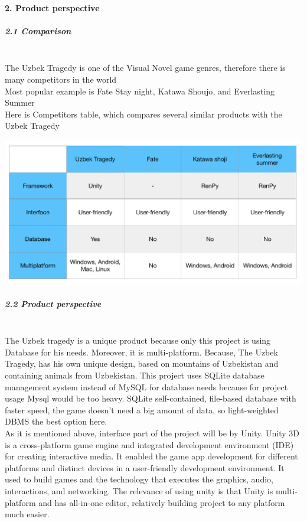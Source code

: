 \documentclass[12pt,a4paper]{article}
\newcommand{\ind}{\indent\indent}
\begin{document}
\newpage
\paragraph{2. Product perspective}
\subparagraph{2.1 Comparison\\}
\ind \\
\ind\indent The Uzbek Tragedy is one of the Visual Novel game genres, therefore there is many competitors in the world\\
\ind\indent Most popular example is Fate Stay night\cite{fate}, Katawa Shoujo\cite{shoujo}, and Everlasting Summer\cite{summer}\\
\ind\indent Here is Competitors table, which compares several similar products with the Uzbek Tragedy\\
\begin{center}
\includegraphics[scale=0.8]{images/Competitor.png} 
\end{center}
\subparagraph{2.2 Product perspective\\}
\ind \\
\ind The Uzbek tragedy is a unique product because only this project is using Database for his needs. Moreover, it is multi-platform. Because, The Uzbek Tragedy, has his own unique design, based on mountains of Uzbekistan and containing animals from Uzbekistan. 
This project uses SQLite database management system instead of MySQL for database needs because for project usage Mysql would be too heavy. SQLite self-contained, file-based database with faster speed, the game doesn't need a big amount of data, so light-weighted DBMS the best option here.\\
\ind As it is mentioned above, interface part of the project will be by Unity. Unity 3D is a cross-platform game engine and integrated development environment (IDE) for creating interactive media. It enabled the game app development for different platforms and distinct devices in a user-friendly development environment. It used to build games and the technology that executes the graphics, audio, interactions, and networking\cite{unity}. The relevance of using unity is that Unity is multi-platform and has all-in-one editor, relatively building project to any platform much easier. 
\newpage
\end{document}
